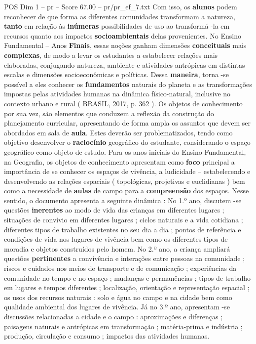 \begin{textsample}{POS Dim 1 – pr – Score 67.00 – pr/pr\_ef\_7.txt}
Com isso, os \textbf{alunos} podem reconhecer de que forma as diferentes comunidades transformam a natureza, \textbf{tanto} em relação às \textbf{inúmeras} possibilidades de uso ao transformá -la em recursos quanto aos impactos \textbf{socioambientais} delas provenientes.
No Ensino Fundamental – Anos \textbf{Finais}, essas noções ganham dimensões \textbf{conceituais} mais \textbf{complexas}, de modo a levar os estudantes a estabelecer relações mais elaboradas, conjugando natureza, ambiente e atividades antrópicas em distintas escalas e dimensões socioeconômicas e políticas.
Dessa \textbf{maneira}, torna -se possível a eles conhecer os \textbf{fundamentos} naturais do planeta e as transformações impostas pelas atividades humanas na dinâmica físico-natural, inclusive no contexto urbano e rural ( BRASIL, 2017, p. 362 ).
Os objetos de conhecimento por sua vez, são elementos que conduzem a reflexão da construção do planejamento curricular, apresentando de forma ampla os assuntos que devem ser abordados em sala de \textbf{aula}.
Estes deverão ser problematizados, tendo como objetivo desenvolver o \textbf{raciocínio} geográfico do estudante, considerando o espaço geográfico como objeto de estudo.
Para os anos iniciais do Ensino Fundamental, na Geografia, os objetos de conhecimento apresentam como \textbf{foco} principal a importância de se conhecer os espaços de vivência, a ludicidade – estabelecendo e desenvolvendo as relações espaciais ( topológicas, projetivas e euclidianas ) bem como a necessidade de \textbf{aulas} de campo para a \textbf{compreensão} dos espaços.
Nesse sentido, o documento apresenta a seguinte dinâmica : No 1.º ano, discutem -se questões \textbf{inerentes} ao modo de vida das crianças em diferentes lugares ; situações de convívio em diferentes lugares ; ciclos naturais e a vida cotidiana ; diferentes tipos de trabalho existentes no seu dia a dia ; pontos de referência e condições de vida nos lugares de vivência bem como os diferentes tipos de moradia e objetos construídos pelo homem.
No 2.º ano, a criança ampliará questões \textbf{pertinentes} a convivência e interações entre pessoas na comunidade ; riscos e cuidados nos meios de transporte e de comunicação ; experiências da comunidade no tempo e no espaço ; mudanças e permanências ; tipos de trabalho em lugares e tempos diferentes ; localização, orientação e representação espacial ; os usos dos recursos naturais : solo e água no campo e na cidade bem como qualidade ambiental dos lugares de vivência.
Já no 3.º ano, apresentam -se discussões relacionadas a cidade e o campo : aproximações e diferenças ; paisagens naturais e antrópicas em transformação ; matéria-prima e indústria ; produção, circulação e consumo ; impactos das atividades humanas.

\end{textsample}
